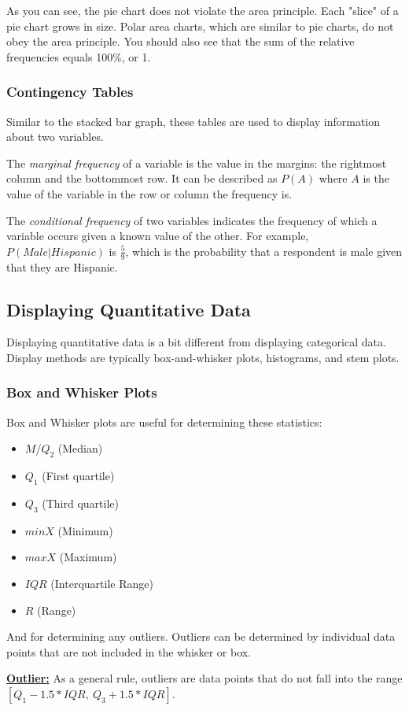 

As you can see, the pie chart does not violate the area principle. Each "slice"
of a pie chart grows in size. Polar area charts, which are similar to pie charts,
do not obey the area principle. You should also see that the sum of the relative frequencies
equals 100\%, or 1.

\subsubsection{Contingency Tables}
Similar to the stacked bar graph, these tables are used to display information
about two variables.


The \emph{marginal frequency} of a variable is the value in the margins: the rightmost column
and the bottommost row. It can be described as $P(A)$ where $A$ is the value of the variable in
the row or column the frequency is. 

The \emph{conditional frequency} of two variables indicates the frequency
of which a variable occurs given a known value of the other. For example,
$P(Male|Hispanic)$ is $\frac{5}{9}$, which is the probability that a respondent
is male given that they are Hispanic.

\subsection{Displaying Quantitative Data}
Displaying quantitative data is a bit different from displaying categorical data.
Display methods are typically box-and-whisker plots, histograms, and stem plots.

\subsubsection{Box and Whisker Plots}


Box and Whisker plots are useful for determining these statistics:

\begin{itemize}
  \item $M$/$Q_2$ (Median)
  \item $Q_1$ (First quartile)
  \item $Q_3$ (Third quartile)
  \item $minX$ (Minimum)
  \item $maxX$ (Maximum)
  \item $IQR$ (Interquartile Range)
  \item $R$ (Range)
\end{itemize}
And for determining any outliers. Outliers can be determined by individual data
points that are not included in the whisker or box.
\begin{mdframed}
  \begin{definition}{\textbf{\underline{Outlier:}}}
    As a general rule, outliers are data points that do not fall into the range
    $[Q_1-1.5*IQR,\:Q_3+1.5*IQR]$.
  \end{definition}
\end{mdframed}

